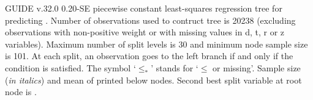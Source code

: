 \documentclass[12pt]{article}
\begin{document}
 \begin{center}
 \end{center}
GUIDE v.32.0  0.20-SE
piecewise constant least-squares regression tree
for predicting \texttt{}.
 Number of observations used to contruct tree is 20238
 (excluding observations with non-positive weight or with missing values
 in d, t, r or z variables).
 Maximum number of split levels is 30 and minimum node sample size is 101.
At each split, an observation goes to the left branch 
 if and only if the condition is satisfied.
 The symbol `$\leq_*$' stands for `$\leq$ or missing'.
Sample size (\emph{in italics}) and mean of \texttt{} printed below nodes.
Second best split variable at root node is \texttt{}.
 
\end{document}
